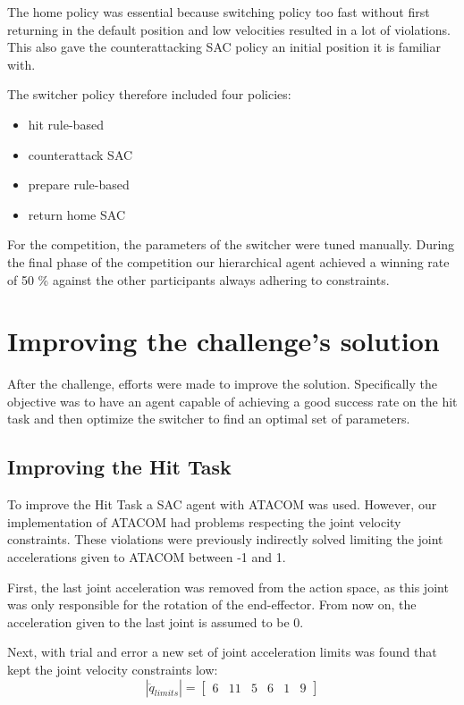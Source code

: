 The home policy was essential because switching policy too fast without first returning in the default position and low velocities resulted in a lot of violations.
This also gave the counterattacking SAC policy an initial position it is familiar with.

The switcher policy therefore included four policies:
\begin{itemize}
    \item hit rule-based
    \item counterattack SAC
    \item prepare rule-based
    \item return home SAC
\end{itemize}

For the competition, the parameters of the switcher were tuned manually.
During the final phase of the competition our hierarchical agent achieved a winning rate of 50 \% against the other participants always adhering to constraints.

\section{Improving the challenge's solution}
After the challenge, efforts were made to improve the solution. Specifically the objective was to have an agent capable of achieving a good success rate on the hit task
and then optimize the switcher to find an optimal set of parameters.

\subsection{Improving the Hit Task}
To improve the Hit Task a SAC agent with ATACOM was used. However, our implementation of ATACOM had problems respecting the joint velocity constraints.
These violations were previously indirectly solved limiting the joint accelerations given to ATACOM between -1 and 1.

First, the last joint acceleration was removed from the action space, as this joint was only responsible for the rotation of the end-effector.
From now on, the acceleration given to the last joint is assumed to be 0.

Next, with trial and error a new set of joint acceleration limits was found that kept the joint velocity constraints low:
\begin{equation*}
    |\ddot{q}_{limits}| = \begin{bmatrix} 6 & 11 & 5 & 6 & 1 & 9 \end{bmatrix}
\end{equation*}

